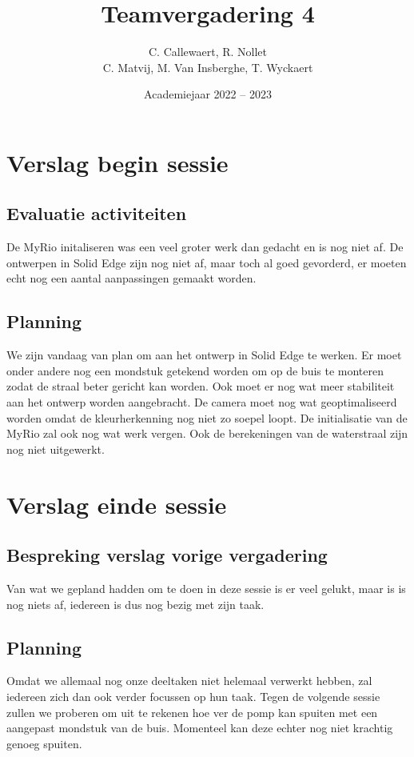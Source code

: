 \documentclass{kulakarticle}
\title{Teamvergadering 4}
\author{C. Callewaert, R. Nollet \\
	C. Matvij, M. Van Insberghe, T. Wyckaert }
\date{Academiejaar 2022 -- 2023}
\begin{document}
	\maketitle
	\section{Verslag begin sessie}

	\subsection{Evaluatie activiteiten}
		De MyRio initaliseren was een veel groter werk dan gedacht en is nog niet af. De ontwerpen in Solid Edge zijn nog niet af, maar toch al goed gevorderd, er moeten echt nog een aantal aanpassingen gemaakt worden. 
	\subsection{Planning}
	We zijn vandaag van plan om aan het ontwerp in Solid Edge te werken. Er moet onder andere nog een mondstuk getekend worden om op de buis te monteren zodat de straal beter gericht kan worden. Ook moet er nog wat meer stabiliteit aan het ontwerp worden aangebracht. De camera moet nog wat geoptimaliseerd worden omdat de kleurherkenning nog niet zo soepel loopt. De initialisatie van de MyRio zal ook nog wat werk vergen. Ook de berekeningen van de waterstraal zijn nog niet uitgewerkt.


	
	\section{Verslag einde sessie}
	
	\subsection{Bespreking verslag vorige vergadering}
	
	Van wat we gepland hadden om te doen in deze sessie is er veel gelukt, maar is is nog niets af, iedereen is dus nog bezig met zijn taak.
	
	\subsection{Planning}
	Omdat we allemaal nog onze deeltaken niet helemaal verwerkt hebben, zal iedereen zich dan ook verder focussen op hun taak. Tegen de volgende sessie zullen we proberen om uit te rekenen hoe ver de pomp kan spuiten met een aangepast mondstuk van de buis. Momenteel kan deze echter nog niet krachtig genoeg spuiten.
	

	

	
\end{document}
